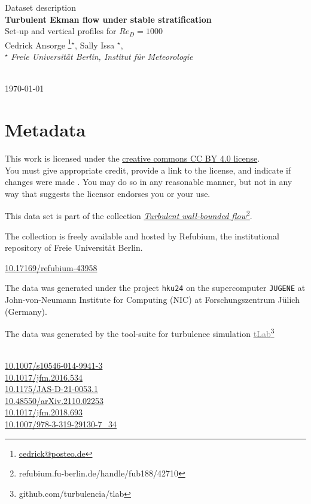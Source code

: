 \documentclass[11pt]{article}
\date{\nodate}
\makeatletter
\newcommand{\dstitle}{Turbulent Ekman flow under stable stratification}
\newcommand{\subtitle}{Set-up and vertical profiles for $Re_D=1000$}
\newcommand{\doi}{10.17169/refubium-43958}
\newcommand{\tlabName}{\textcolor{gray}{tLab}}
\newcommand{\authors}{
    Cedrick Ansorge \footnote{\href{mailto:cedrick@posteo.de}{cedrick@posteo.de}}$^\star$, \hspace{0.05cm}  
    Sally Issa $^\star$\hspace{0.05cm},\\
    {\small \light{$^\star$ \emph{ Freie Universit\"at Berlin, Institut f\"ur Meteorologie} \\
   }
   }
}
\newcommand{\light}[1]{\textcolor{black!80}{#1}}
\newcommand{\printdoi}[1]{\href{https://dx.doi.org/#1}{#1}}
\makeatother
\begin{document}
{ \selectfont
\begin{centering}

 \light{\large Dataset description} \\[1em] 
 {\LARGE \bfseries \sffamily\dstitle} \\[1em]
 \light{\large\subtitle} \\[1em]
 \authors\\ 
\end{centering}
\light{\hfill \today}
}


\section{Metadata}
\begin{description}
\sffamily
\item[\textcopyright] This work is licensed under the \href{https://creativecommons.org/licenses/by/4.0}{creative commons CC BY 4.0 license}. \\ {\small\light{You must give appropriate credit, provide a link to the license, and indicate if changes were made . You may do so in any reasonable manner, but not in any way that suggests the licensor endorses you or your use. }}
\item[\sffamily Collection] This data set is part of the collection \href{https://refubium.fu-berlin.de/handle/fub188/42710}{\emph{Turbulent wall-bounded flow}\footnote{\url{refubium.fu-berlin.de/handle/fub188/42710}}}.

{\small \light{The collection is freely available and hosted by Refubium, the  institutional repository of Freie Universit\"at Berlin.}}

\item[\sffamily DOI]\printdoi{\doi}
\item[\sffamily HPC systems] The data was generated under the project \texttt{hku24} on the supercomputer \texttt{JUGENE} at John-von-Neumann Institute for Computing (NIC) at Forschungszentrum J\"ulich (Germany). 
\item[\sffamily Code] The data was generated by the tool-suite for turbulence simulation \href{https://github.com/turbulencia/tlab}{\tlabName\footnote{\url{github.com/turbulencia/tlab}}}

\item[\sffamily Related Publications] \phantom{A}~\\
    \printdoi{10.1007/s10546-014-9941-3}\\
    \printdoi{10.1017/jfm.2016.534} \\
    \printdoi{10.1175/JAS-D-21-0053.1} \\
    \printdoi{10.48550/arXiv.2110.02253} \\
    \printdoi{10.1017/jfm.2018.693}\\
    \printdoi{10.1007/978-3-319-29130-7\_34}\\

\end{description}
\end{document}
